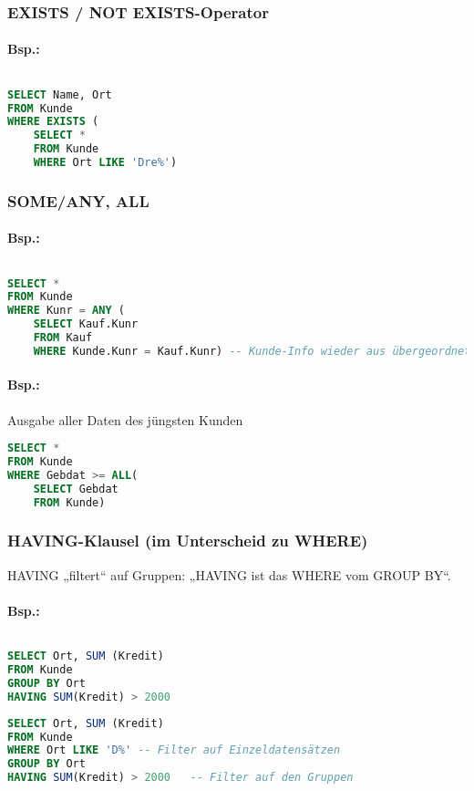 \subsubsection{EXISTS / NOT EXISTS-Operator}
\paragraph{Bsp.:} $ $
\begin{lstlisting}[language=SQL]
SELECT Name, Ort
FROM Kunde
WHERE EXISTS (
	SELECT * 
	FROM Kunde
	WHERE Ort LIKE 'Dre%')
\end{lstlisting}
\subsubsection{SOME/ANY, ALL}
\paragraph{Bsp.:}$ $
\begin{lstlisting}[language=SQL]
SELECT *
FROM Kunde
WHERE Kunr = ANY (
	SELECT Kauf.Kunr
	FROM Kauf
	WHERE Kunde.Kunr = Kauf.Kunr) -- Kunde-Info wieder aus übergeordneter Abfrage
\end{lstlisting}
\paragraph{Bsp.:} Ausgabe aller Daten des jüngsten Kunden
\begin{lstlisting}[language=SQL]
SELECT * 
FROM Kunde
WHERE Gebdat >= ALL(
	SELECT Gebdat
	FROM Kunde)
\end{lstlisting}
\subsubsection{HAVING-Klausel (im Unterscheid zu WHERE)}
HAVING „filtert“ auf Gruppen: „HAVING ist das WHERE vom GROUP BY“.
\paragraph{Bsp.:} $ $
\begin{lstlisting}[language=SQL]
SELECT Ort, SUM (Kredit)
FROM Kunde
GROUP BY Ort
HAVING SUM(Kredit) > 2000
\end{lstlisting}
\begin{lstlisting}[language=SQL]
SELECT Ort, SUM (Kredit)
FROM Kunde
WHERE Ort LIKE 'D%'	-- Filter auf Einzeldatensätzen
GROUP BY Ort
HAVING SUM(Kredit) > 2000	-- Filter auf den Gruppen
\end{lstlisting}

